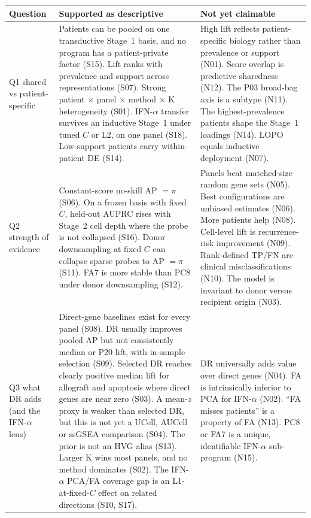 {\footnotesize
\begin{longtable}{>{\raggedright\arraybackslash}p{1.7cm} >{\raggedright\arraybackslash}p{6.9cm} >{\raggedright\arraybackslash}p{6.4cm}}
\toprule
Question & Supported as descriptive & Not yet claimable \\
\midrule
\endhead
Q1 shared vs patient-specific &
Patients can be pooled on one transductive Stage~1 basis, and no program has a patient-private factor (S15). Lift ranks with prevalence and support across representations (S07). Strong patient $\times$ panel $\times$ method $\times$ K heterogeneity (S01). IFN-$\alpha$ transfer survives an inductive Stage~1 under tuned $C$ or L2, on one panel (S18). Low-support patients carry within-patient DE (S14). &
High lift reflects patient-specific biology rather than prevalence or support (N01). Score overlap is predictive sharedness (N12). The P03 broad-bag axis is a subtype (N11). The highest-prevalence patients shape the Stage~1 loadings (N14). LOPO equals inductive deployment (N07). \\
\addlinespace
Q2 strength of evidence &
Constant-score no-skill AP $=\pi$ (S06). On a frozen basis with fixed $C$, held-out AUPRC rises with Stage~2 cell depth where the probe is not collapsed (S16). Donor downsampling at fixed $C$ can collapse sparse probes to AP $=\pi$ (S11). FA7 is more stable than PC8 under donor downsampling (S12). &
Panels beat matched-size random gene sets (N05). Best configurations are unbiased estimates (N06). More patients help (N08). Cell-level lift is recurrence-risk improvement (N09). Rank-defined TP/FN are clinical misclassifications (N10). The model is invariant to donor versus recipient origin (N03). \\
\addlinespace
Q3 what DR adds (and the IFN-$\alpha$ lens) &
Direct-gene baselines exist for every panel (S08). DR usually improves pooled AP but not consistently median or P20 lift, with in-sample selection (S09). Selected DR reaches clearly positive median lift for allograft and apoptosis where direct genes are near zero (S03). A mean-$z$ proxy is weaker than selected DR, but this is not yet a UCell, AUCell or ssGSEA comparison (S04). The prior is not an HVG alias (S13). Larger K wins most panels, and no method dominates (S02). The IFN-$\alpha$ PCA/FA coverage gap is an L1-at-fixed-$C$ effect on related directions (S10, S17). &
DR universally adds value over direct genes (N04). FA is intrinsically inferior to PCA for IFN-$\alpha$ (N02). ``FA misses patients'' is a property of FA (N13). PC8 or FA7 is a unique, identifiable IFN-$\alpha$ sub-program (N15). \\
\bottomrule
\end{longtable}
}
\addtocounter{table}{-1}

